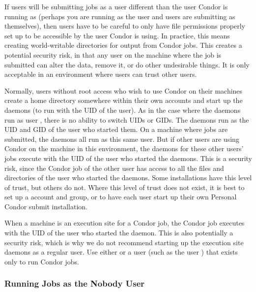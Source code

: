 If users will be submitting jobs as a user different than the user
Condor is running as (perhaps you are running as the  user and
users are submitting as themselves), then users have to be careful to
only have file permissions properly set up to be accessible by the
user Condor is using. In practice, this means creating world-writable
directories for output from Condor jobs.  This creates a potential
security risk, in that any user on the machine where the job is
submitted can alter the data, remove it, or do other undesirable
things.  It is only acceptable in an environment where users can trust
other users.

Normally, users without root access who wish to use Condor on their
machines create a  home directory somewhere within their
own accounts and start up the daemons (to run with the UID of the
user).  As in the case where the daemons run as user , there is
no ability to switch UIDs or GIDs.  The daemons run as the UID and GID
of the user who started them.  On a machine where jobs are submitted,
the  daemons all run as this same user. But if other
users are using Condor on the machine in this environment, the
 daemons for these other users' jobs execute with the
UID of the user who started the daemons.  This is a security risk,
since the Condor job of the other user has access to all the files and
directories of the user who started the daemons.  Some installations
have this level of trust, but others do not.  Where this level of
trust does not exist, it is best to set up a  account and group,
or to have each user start up their own Personal Condor submit
installation.

When a machine is an execution site for a Condor job, the Condor job
executes with the UID of the user who started the 
daemon.  This is also potentially a security risk, which is why we do
not recommend starting up the execution site daemons as a regular
user.  Use either  or a user
(such as the user ) that exists
only to run Condor jobs.

\subsubsection{\label{sec:RunAsNobody}Running Jobs as the Nobody User}

